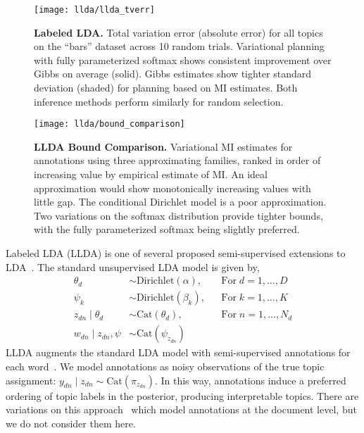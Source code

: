 \begin{figure}[t]
  \centering
  \texttt{[image: llda/llda\_tverr]} \vspace{-2mm}
  
  \caption{\small\textbf{Labeled LDA.} Total variation error (absolute
  error) for all topics on the ``bars'' dataset across 10 random
  trials.  Variational planning with fully parameterized softmax shows
  consistent improvement over Gibbs on average (solid).  Gibbs
  estimates show tighter standard deviation (shaded) for planning
  based on MI estimates.  Both inference methods perform similarly
  for random selection.}
  
  \label{fig:llda_tv}
\end{figure}

\begin{figure}[t]
  \centering
  \texttt{[image: llda/bound\_comparison]}
  
  \caption{\small\textbf{LLDA Bound Comparison.} Variational MI
  estimates for annotations using three approximating families, ranked
  in order of increasing value by empirical estimate of MI.  An ideal
  approximation would show monotonically increasing values with little
  gap.  The conditional Dirichlet model is a poor approximation.  Two
  variations on the softmax distribution provide tighter bounds, with
  the fully parameterized softmax being slightly
  preferred.}  \label{fig:llda_bound}
\end{figure}

Labeled LDA (LLDA) is one of several proposed semi-supervised
extensions to LDA~\citep{blei2003latent}.  The standard unsupervised
LDA model is given by,
\begin{align*}
  \theta_d &\sim \text{Dirichlet}(\alpha), &&\text{For}\; d=1,\ldots,D \\
  \psi_k &\sim \text{Dirichlet}(\beta_k), &&\text{For}\; k=1,\ldots,K \\
  z_{dn} \mid \theta_d &\sim \text{Cat}(\theta_d), &&\text{For}\;
    n=1,\ldots,N_d \\
  w_{dn} \mid z_{dn}, \psi &\sim \text{Cat}(\psi_{z_{dn}}) &&
\end{align*}
LLDA augments the standard LDA model with semi-supervised annotations
for each word~\citep{flaherty2005latent}.  We model annotations as
noisy observations of the true topic assignment: \mbox{$y_{dn} \mid
  z_{dn} \sim \text{Cat}(\pi_{z_{dn}})$}.  In this way, annotations
induce a preferred ordering of topic labels in the posterior,
producing interpretable topics.  There are variations on this
approach~\citep{ramage2009labeled} which model annotations at the
document level, but we do not consider them here.

